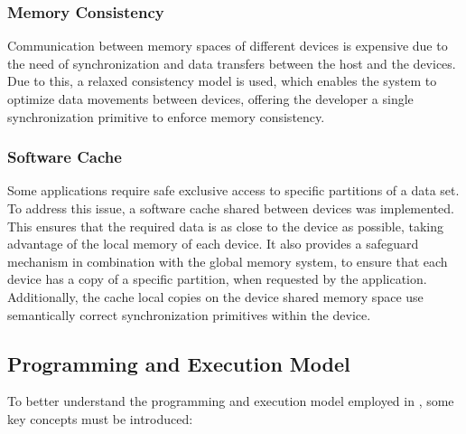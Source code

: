\documentclass[main.tex]{subfiles}
\begin{document}
\subsubsection{Memory Consistency}

Communication between memory spaces of different devices is expensive due to the need of synchronization and data transfers between the host \cpu and the devices. Due to this, a relaxed consistency model is used, which enables the system to optimize data movements between devices, offering the developer a single synchronization primitive to enforce memory consistency.

\subsubsection{Software Cache}

Some applications require safe exclusive access to specific partitions of a data set. To address this issue, a software cache shared between devices was implemented. This ensures that the required data is as close to the device as possible, taking advantage of the local memory of each device. It also provides a safeguard mechanism in combination with the global memory system, to ensure that each device has a copy of a specific partition, when requested by the application. Additionally, the cache local copies on the device shared memory space use semantically correct synchronization primitives within the device.



\subsection{Programming and Execution Model}

To better understand the programming and execution model employed in \gama, some key concepts must be introduced:
\end{document}
